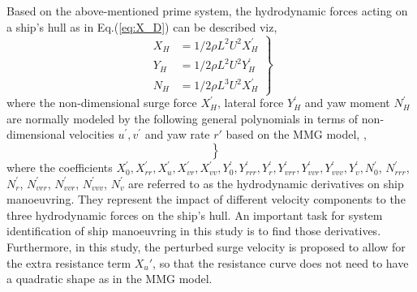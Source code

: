 \noindent Based on the above-mentioned prime system, the hydrodynamic forces acting on a ship's hull as in Eq.(\ref{eq:X_D}) can be described viz,
\begin{equation}
    \label{eq:XYN_H}
    \left.\begin{aligned}
    X_H & = 1/2\rho L^{2} U^{2} X_H^{'}  \\
    Y_H & = 1/2\rho L^{2} U^{2} Y_H^{'}  \\
    N_H & = 1/2\rho L^{3} U^{2} X_H^{'}
    \end{aligned}\right\}
\end{equation}
where the non-dimensional surge force $X_H^{'}$, lateral force $Y_H^{'}$ and yaw moment $N_H^{'}$ are normally modeled by the following general polynomials in terms of non-dimensional velocities $u^{'}, v^{'}$ and yaw rate $r'$ based on the MMG model, \citep{yasukawaIntroductionMMGStandard2015},
\begin{equation}
    \label{eq:XYN_H_prime}
    \left.\begin{aligned}
     \\
     \\
    
    \end{aligned}\right\}
\end{equation}
where the coefficients $X_0^{'}, X_{rr}^{'}, X_u^{'}, X_{vr}^{'}, X_{vv}^{'}, Y_{0}^{'}, Y_{rrr}^{'}, Y_{r}^{'}, Y_{vrr}^{'}, Y_{vvr}^{'}, Y_{vvv}^{'}, Y_{v}^{'}, N_{0}^{'}$, $N_{rrr}^{'}$, $N_{r}^{'}$, $N_{vrr}^{'}$, $N_{vvr}^{'}$, $N_{vvv}^{'}$, $N_{v}^{'}$ are referred to as the hydrodynamic derivatives on ship manoeuvring. They represent the impact of different velocity components to the three hydrodynamic forces on the ship's hull. An important task for system identification of ship manoeuvring in this study is to find those derivatives. Furthermore, in this study, the perturbed surge velocity is proposed to allow for the extra resistance term ${X_u}'$, so that the resistance curve does not need to have a quadratic shape as in the MMG model.  
%
%     
%     
